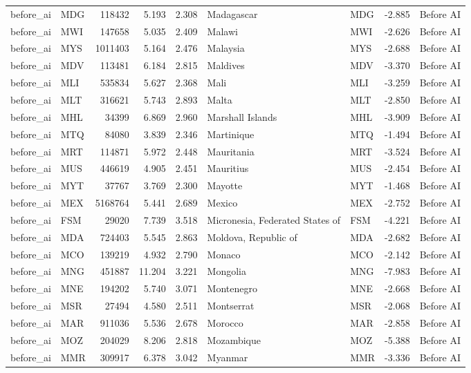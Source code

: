 \begin{tabular}{llrrrllrl}
before\_ai & MDG & 118432 & 5.193 & 2.308 & Madagascar & MDG & -2.885 & Before AI \\
before\_ai & MWI & 147658 & 5.035 & 2.409 & Malawi & MWI & -2.626 & Before AI \\
before\_ai & MYS & 1011403 & 5.164 & 2.476 & Malaysia & MYS & -2.688 & Before AI \\
before\_ai & MDV & 113481 & 6.184 & 2.815 & Maldives & MDV & -3.370 & Before AI \\
before\_ai & MLI & 535834 & 5.627 & 2.368 & Mali & MLI & -3.259 & Before AI \\
before\_ai & MLT & 316621 & 5.743 & 2.893 & Malta & MLT & -2.850 & Before AI \\
before\_ai & MHL & 34399 & 6.869 & 2.960 & Marshall Islands & MHL & -3.909 & Before AI \\
before\_ai & MTQ & 84080 & 3.839 & 2.346 & Martinique & MTQ & -1.494 & Before AI \\
before\_ai & MRT & 114871 & 5.972 & 2.448 & Mauritania & MRT & -3.524 & Before AI \\
before\_ai & MUS & 446619 & 4.905 & 2.451 & Mauritius & MUS & -2.454 & Before AI \\
before\_ai & MYT & 37767 & 3.769 & 2.300 & Mayotte & MYT & -1.468 & Before AI \\
before\_ai & MEX & 5168764 & 5.441 & 2.689 & Mexico & MEX & -2.752 & Before AI \\
before\_ai & FSM & 29020 & 7.739 & 3.518 & Micronesia, Federated States of & FSM & -4.221 & Before AI \\
before\_ai & MDA & 724403 & 5.545 & 2.863 & Moldova, Republic of & MDA & -2.682 & Before AI \\
before\_ai & MCO & 139219 & 4.932 & 2.790 & Monaco & MCO & -2.142 & Before AI \\
before\_ai & MNG & 451887 & 11.204 & 3.221 & Mongolia & MNG & -7.983 & Before AI \\
before\_ai & MNE & 194202 & 5.740 & 3.071 & Montenegro & MNE & -2.668 & Before AI \\
before\_ai & MSR & 27494 & 4.580 & 2.511 & Montserrat & MSR & -2.068 & Before AI \\
before\_ai & MAR & 911036 & 5.536 & 2.678 & Morocco & MAR & -2.858 & Before AI \\
before\_ai & MOZ & 204029 & 8.206 & 2.818 & Mozambique & MOZ & -5.388 & Before AI \\
before\_ai & MMR & 309917 & 6.378 & 3.042 & Myanmar & MMR & -3.336 & Before AI \\

\end{tabular}
